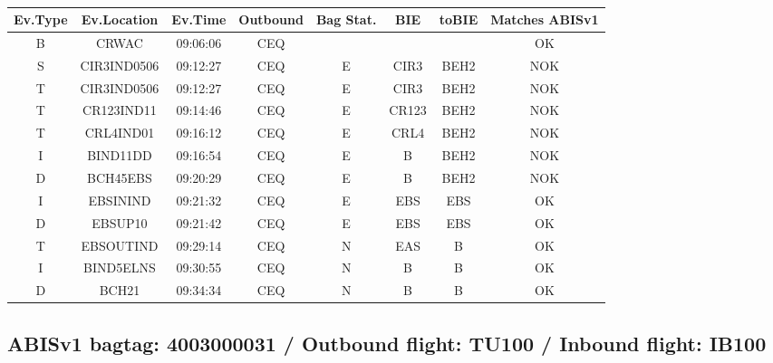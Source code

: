 \documentclass{report}
\begin{document}
\paragraph{}
\begin{longtable}{cccccccc}    \toprule
\rowcolor{white!50}
\textbf{Ev.Type} & \textbf{Ev.Location} & \textbf{Ev.Time} & \textbf{Outbound} & \textbf{Bag Stat.} & \textbf{BIE} & \textbf{toBIE} & \textbf{Matches ABISv1} \\\midrule
B & CRWAC & 09:06:06  & CEQ &  &  &  & OK\\
S & CIR3IND0506 & 09:12:27  & CEQ & E & CIR3 & BEH2 & NOK\\
T & CIR3IND0506 & 09:12:27  & CEQ & E & CIR3 & BEH2 & NOK\\
T & CR123IND11 & 09:14:46  & CEQ & E & CR123 & BEH2 & NOK\\
T & CRL4IND01 & 09:16:12  & CEQ & E & CRL4 & BEH2 & NOK\\
I & BIND11DD & 09:16:54  & CEQ & E & B & BEH2 & NOK\\
D & BCH45EBS & 09:20:29  & CEQ & E & B & BEH2 & NOK\\
I & EBSININD & 09:21:32  & CEQ & E & EBS & EBS & OK\\
D & EBSUP10 & 09:21:42  & CEQ & E & EBS & EBS & OK\\
T & EBSOUTIND & 09:29:14  & CEQ & N & EAS & B & OK\\
I & BIND5ELNS & 09:30:55  & CEQ & N & B & B & OK\\
D & BCH21 & 09:34:34  & CEQ & N & B & B & OK\\
\bottomrule
\end{longtable}
\subsection*{ABISv1 bagtag: 4003000031 / Outbound flight: TU100 / Inbound flight: IB100}
\end{document}
